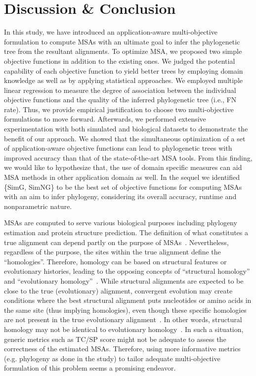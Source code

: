 \section{Discussion \& Conclusion}
\label{sec:discussion}
In this study, we have introduced an application-aware multi-objective formulation to compute MSAs with an ultimate goal to infer the phylogenetic tree from the resultant alignments. To optimize MSA, we proposed two simple objective functions in addition to the existing ones. We judged the potential capability of each objective function to yield better trees by employing domain knowledge as well as by applying statistical approaches. We employed multiple linear regression to measure the degree of association between the individual objective functions and the quality of the inferred phylogenetic tree (i.e., FN rate). Thus, we provide empirical justification to choose two multi-objective formulations to move forward. Afterwards, we performed extensive experimentation with both simulated and biological datasets to demonstrate the benefit of our approach. We showed that the simultaneous optimization of a set of application-aware objective functions can lead to phylogenetic trees with improved accuracy than that of the state-of-the-art MSA tools. From this finding, we would like to hypothesize that, the use of domain specific measures can aid MSA methods in other application domain as well. In the sequel we identified \{SimG, SimNG\} to be the best set of objective functions for computing MSAs with an aim to infer phylogeny, considering its overall accuracy, runtime and nonparametric nature.

MSAs are computed to serve various biological purposes including phylogeny estimation and protein structure prediction. The definition of what constitutes a true alignment can depend partly on the purpose of MSAs~\citep{warnow2017computational}. Nevertheless, regardless of the purpose, the sites within the true alignment define the ``homologies''. Therefore, homology can be based on structural features or evolutionary histories, leading to the opposing concepts of ``structural homology'' and ``evolutionary homology''~\citep{warnow2017computational}. While structural alignments are expected to be close to the true (evolutionary) alignment, convergent evolution may create conditions where the best structural alignment puts nucleotides or amino acids in the same site (thus implying homologies), even though these specific homologies are not present in the true evolutionary alignment~\citep{iantorno2014watches}. In other words, structural homology may not be identical to evolutionary homology~\citep{reeck1987homology}. In such a situation, generic metrics such as TC/SP score might not be adequate to assess the correctness of the estimated MSAs. Therefore, using more informative metrics (e.g. phylogeny as done in the study) to tailor adequate multi-objective formulation of this problem seems a promising endeavor.

